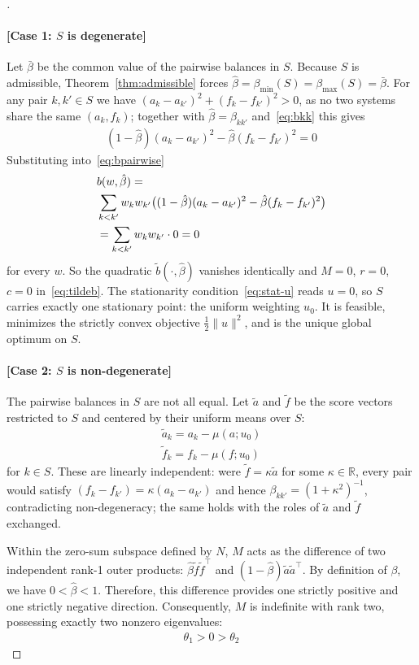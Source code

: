 \documentclass[11pt]{article}
\begin{document}
\begin{proof}[]
\paragraph{[Case 1: $S$ is degenerate]} Let $\bar\beta$ be the common value of the pairwise balances in $S$. Because $S$ is admissible, Theorem~\ref{thm:admissible} forces $\hat\beta = \beta_{\min}(S)=\beta_{\max}(S)=\bar\beta$. For any pair $k,k' \in S$ we have $(a_k{-}a_{k'})^2 + (f_k{-}f_{k'})^2 > 0$, as no two systems share the same $(a_k,f_k)$; together with $\hat\beta = \beta_{kk'}$ and~\eqref{eq:bkk} this gives
\begin{align}
    (1-\hat\beta)(a_k{-}a_{k'})^2 - \hat\beta (f_k{-}f_{k'})^2 = 0
\end{align}
Substituting into~\eqref{eq:bpairwise}
\begin{align}
    &b(w,\hat\beta) = \notag\\ 
    &\sum_{k<k'} w_k w_{k'} \big( (1-\hat\beta)(a_k - a_{k'})^2 - \hat\beta(f_k - f_{k'})^2 \big) \notag\\
    &=\sum_{k<k'} w_k w_{k'} \cdot 0 = 0
\end{align}
for {every} $w$. So the quadratic $\tilde b(\cdot,\hat\beta)$ vanishes identically and $M = 0$, $r = 0$, $c = 0$ in~\eqref{eq:tildeb}. The stationarity condition~\eqref{eq:stat-u} reads $u = 0$, so $S$ carries exactly one stationary point: the uniform weighting $u_0$. It is feasible, minimizes the strictly convex objective $\tfrac12\|u\|^2$, and is the unique global optimum on $S$.

\paragraph{[Case 2: $S$ is non-degenerate]} The pairwise balances in $S$ are not all equal. Let $\tilde a$ and $\tilde f$ be the score vectors restricted to $S$ and centered by their uniform means over $S$:
\begin{align}
    \tilde a_k = a_k - \mu(a; u_0)\\
    \tilde f_k = f_k - \mu(f; u_0)
\end{align}
for $k \in S$. These are linearly independent: were $\tilde f = \kappa \tilde a$ for some $\kappa \in \mathbb R$, every pair would satisfy $(f_k{-}f_{k'}) = \kappa (a_k{-}a_{k'})$ and hence $\beta_{kk'} = (1+\kappa^2)^{-1}$, contradicting non-degeneracy; the same holds with the roles of $\tilde a$ and $\tilde f$ exchanged.

Within the zero-sum subspace defined by $N$, $M$ acts as the difference of two independent rank-1 outer products: $\hat\beta \tilde f \tilde f^\top$ and $(1-\hat\beta)\tilde a \tilde a^\top$. 
By definition of $\beta$, we have $0 < \hat\beta < 1$. Therefore, this difference provides one strictly positive and one strictly negative direction. Consequently, $M$ is indefinite with rank two, possessing exactly two nonzero eigenvalues:
\begin{align}
    \theta_1 > 0 > \theta_2 \label{eq:eigenvalues}
\end{align}


\end{proof}
\end{document}
